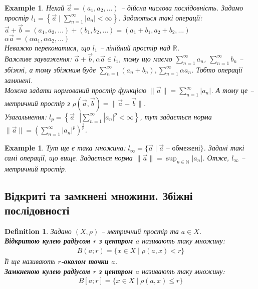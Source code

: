 \documentclass[a4paper, 10pt]{article}
\theoremstyle{theoremdd}
\theoremstyle{theoremdd}
\newtheorem{definition}[theorem]{Definition}
\theoremstyle{theoremdd}
\theoremstyle{theoremdd}
\newtheorem{example}[theorem]{Example}
\theoremstyle{theoremdd}
\theoremstyle{theoremdd}
\theoremstyle{theoremdd}
\theoremstyle{theoremdd}
\begin{document}
\begin{example} Нехай $\vec{a} = (a_1,a_2,\dots)$ -- дійсна числова послідовність. Задамо простір $l_1 = \left\{ \vec{a} \mid \displaystyle\sum_{n=1}^\infty |a_n| < \infty \right\}$. Задаються такі операції:\\
$\vec{a} + \vec{b} = (a_1,a_2,\dots) + (b_1,b_2,\dots) = (a_1+b_1,a_2+b_2,\dots)$\\
$\alpha \vec{a} = (\alpha a_1, \alpha a_2, \dots)$\\
Неважко переконатися, що $l_1$ -- лінійний простір над $\mathbb{R}$.\\
Важливе зауваження: $\vec{a}+\vec{b}, \alpha \vec{a} \in l_1$, тому що маємо $\displaystyle\sum_{n=1}^\infty a_n$, $\displaystyle\sum_{n=1}^\infty b_n$ -- збіжні, а тому збіжним буде $\displaystyle \sum_{n=1}^\infty (a_n+b_n), \sum_{n=1}^\infty \alpha a_n$. Тобто операції замкнені.\\
Можна задати нормований простір функцією $\| \vec{a} \| = \displaystyle \sum_{n=1}^\infty |a_n|$. А тому це -- метричний простір з $\rho(\vec{a}, \vec{b}) = \|\vec{a} - \vec{b}\|$.
\bigskip \\
Узагальнення: $l_p = \left\{ \vec{a} \text{ } | \displaystyle\sum_{n=1}^\infty |a_n|^p < \infty \right\}$, тут задається норма $\|\vec{a}\| = \left( \displaystyle\sum_{n=1}^\infty |a_n|^p \right)^{\frac{1}{p}}$.
\end{example}

\begin{example}
Тут ще є така множина: $l_{\infty} = \{ \vec{a} \mid \vec{a} \text{ -- обмежені} \}$. Задані такі самі операції, що вище. Задається норма $\|\vec{a}\| = \displaystyle \sup_{n \in \mathbb{N}} |a_n|$. Отже, $l_{\infty}$ -- метричний простір.
\end{example}

\subsection{Відкриті та замкнені множини. Збіжні послідовності}
\begin{definition}
Задано $(X,\rho)$ -- метричний простір та $a \in X$.\\
\textbf{Відкритою кулею радіусом $r$ з центром $a$} називають таку множину:
\begin{align*}
B(a;r) = \{x \in X \mid \rho(a,x) < r\}
\end{align*}
Її ще називають $r$\textbf{-околом точки $a$}.\\
\textbf{Замкненою кулею радіусом $r$ з центром $a$} називають таку множину:
\begin{align*}
B[a;r] = \{x \in X \mid \rho(a,x) \leq r \}
\end{align*}
\end{definition}
\end{document}

